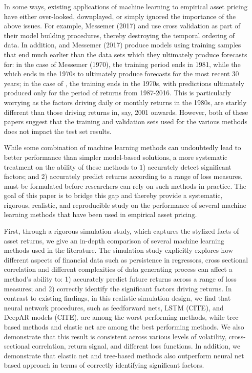 \documentclass{article}
\begin{document}
In some ways, existing applications of machine learning to empirical asset pricing have either over-looked, downplayed, or simply ignored the importance of the above issues. For example, Messemer (2017) and \cite{feng_deep_2018} use cross validation as part of their model building procedures, thereby destroying the temporal ordering of data. In addition, \cite{gu_empirical_2018} and Messemer (2017) produce models using training samples that end much earlier than the data sets which they ultimately produce forecasts for: in the case of Messemer (1970), the training period ends in 1981, while the  which ends in the 1970s to ultimately produce forecasts for the most recent 30 years; in the case of \cite{gu_empirical_2018}, the training ends in the 1970s, with predictions ultimately produced only for the period of returns from 1987-2016.  This is particularly worrying as the factors driving daily or monthly returns in the 1980s, are starkly different than those driving returns in, say, 2001 onwards. However, both of these papers suggest that the training and validation sets used for the various methods does not impact the test set results. 

While some combination of machine learning methods can undoubtedly lead to better performance than simpler model-based solutions, a more systematic treatment on the ability of these methods to 1) accurately detect significant factors; and 2) accurately predict returns according to a range of loss measures, must be formulated before researchers can rely on such methods in practice. The goal of this paper is to bridge this gap and thereby provide a systematic, rigorous, realistic, and reproducible study on the performance of several machine learning methods that have been used in empirical asset pricing. 

First, through a rigorous simulation study, which captures the stylized facts of asset returns, we give an in-depth comparison of several machine learning methods used in the literature. The simulation study explicitly explores how different aspects of financial data such as persistence in regressors, cross sectional correlation and different complexities of data generating process can affect a method's ability to: 1) accurately predict future returns across a range of loss measures; and 2) correctly identify the significant factors driving returns. In contrast to existing findings, in this realistic simulation design, we find that neural network procedures, such as feedforward nets, LSTM (CITE), and DeepAR models (CITE), are among the worst performing methods, while tree-based methods and elastic net are among the best performing methods. We also demonstrate that this result is consistent across various levels of volatility, cross-sectional correlation, return signal, and different loss functions. In addition, we demonstrate that elastic net and tree-based methods also outperform neural net based approach in terms of correctly identifying significant factors.     
\end{document}

